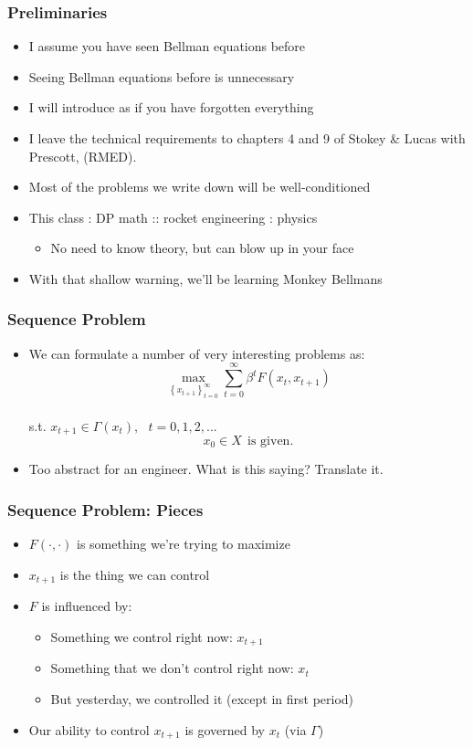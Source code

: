 \documentclass{beamer}
\author{Trevor Gallen}
\date{}
\begin{document}
\begin{frame}
\titlepage
\end{frame}

\begin{frame}
\frametitle[alignment=center]{Preliminaries}
\begin{itemize}
\item I assume you have seen Bellman equations before
\bigskip
\item Seeing Bellman equations before is unnecessary
\bigskip
\item I will introduce as if you have forgotten everything
\bigskip
\item I leave the technical requirements to chapters 4 and 9 of Stokey \& Lucas with Prescott, (RMED).
\bigskip
\item Most of the problems we write down will be well-conditioned
\bigskip
\item This class : DP math :: rocket engineering : physics
\bigskip
\begin{itemize}
\item<2-> No need to know theory, but can blow up in your face
\bigskip
\end{itemize}
\item<3-> With that shallow warning, we'll be learning Monkey Bellmans
\end{itemize}
\end{frame}

\begin{frame}
\frametitle[alignment=center]{Sequence Problem}
\begin{itemize}
\item We can formulate a number of very interesting problems as:
$$\underset{\left\{x_{t+1}\right\}_{t=0}^\infty}{\max}\sum_{t=0}^\infty \beta^t F(x_t,x_{t+1})$$
\ \\
s.t. $x_{t+1}\in\Gamma(x_t),\ \ \ t=0,1,2,...$
$$x_0\in X\ \ \text{is given}.$$
\item<2-> Too abstract for an engineer.  What is this saying?  Translate it.
\end{itemize}
\end{frame}

\begin{frame}
\frametitle[alignment=center]{Sequence Problem: Pieces}
\begin{itemize}
\item $F(\cdot,\cdot)$ is something we're trying to maximize
\bigskip
\item $x_{t+1}$ is the thing we can control
\bigskip
\item $F$ is influenced by:
\bigskip
\begin{itemize}
\item  Something we control right now: $x_{t+1}$  
\bigskip
\item Something that we don't control right now: $x_t$ 
\bigskip
\item But yesterday, we controlled it (except in first period)
\end{itemize}
\bigskip
\item Our ability to control $x_{t+1}$ is governed by $x_t$ (via $\Gamma$)
\end{itemize}
\end{frame}
\end{document}
